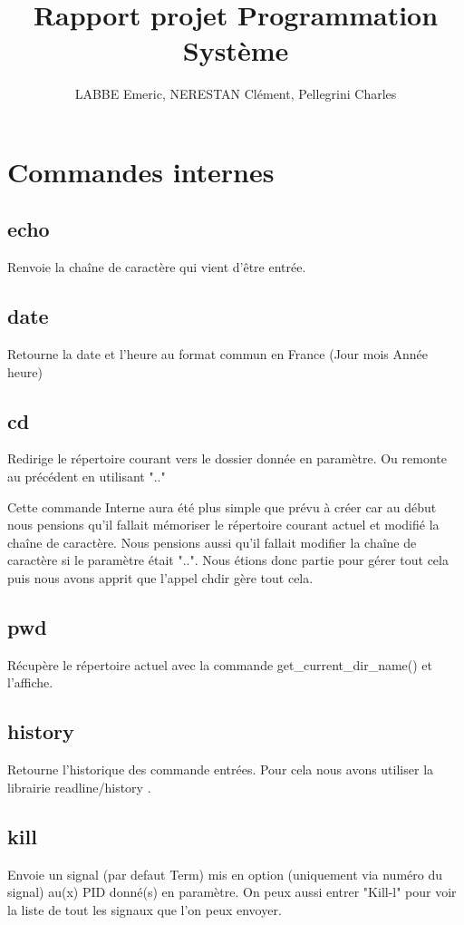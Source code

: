 \documentclass[12pt]{report}
\author{LABBE Emeric, NERESTAN Clément, Pellegrini Charles}
\title{Rapport projet Programmation Système}
\begin{document}
\maketitle
\tableofcontents

\newpage
\section{Commandes internes}

\subsection{echo}
Renvoie la chaîne de caractère qui vient d’être entrée.

\subsection{date}
Retourne la date et l'heure au format commun en France (Jour mois Année heure)
\subsection{cd}
Redirige le répertoire courant vers le dossier donnée en paramètre. Ou remonte au précédent en utilisant ".." 

Cette commande Interne aura été plus simple que prévu à créer car au début nous pensions qu'il fallait mémoriser le répertoire courant actuel et modifié la chaîne de caractère. Nous pensions aussi qu'il fallait modifier la chaîne de caractère si le paramètre était "..". Nous étions donc partie pour gérer tout cela puis nous avons apprit que l'appel chdir gère tout cela.
\subsection{pwd}
Récupère le répertoire actuel avec la commande get\_current\_dir\_name() et l'affiche.

\subsection{history}
Retourne l'historique des commande entrées. Pour cela nous avons utiliser la librairie readline/history .

\subsection{kill}
Envoie un signal (par defaut Term) mis en option (uniquement via numéro du signal) au(x) PID donné(s) en paramètre. On peux aussi entrer "Kill-l" pour voir la liste de tout les signaux que l'on peux envoyer.
\end{document}

